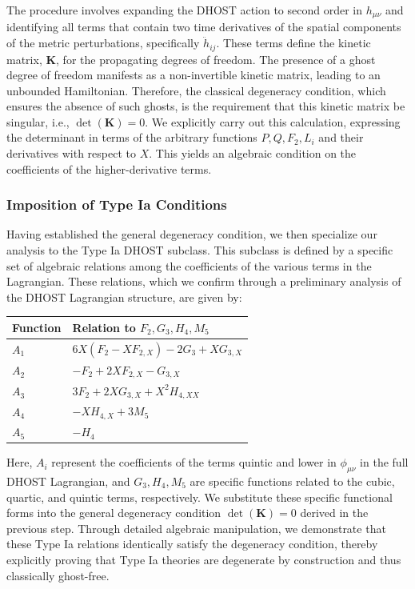 \documentclass[twocolumn]{aastex631}
\begin{document}
The procedure involves expanding the DHOST action to second order in $h_{\mu\nu}$ and identifying all terms that contain two time derivatives of the spatial components of the metric perturbations, specifically $\ddot{h}_{ij}$. These terms define the kinetic matrix, $\mathbf{K}$, for the propagating degrees of freedom. The presence of a ghost degree of freedom manifests as a non-invertible kinetic matrix, leading to an unbounded Hamiltonian. Therefore, the classical degeneracy condition, which ensures the absence of such ghosts, is the requirement that this kinetic matrix be singular, i.e., $\det(\mathbf{K}) = 0$. We explicitly carry out this calculation, expressing the determinant in terms of the arbitrary functions $P, Q, F_2, L_i$ and their derivatives with respect to $X$. This yields an algebraic condition on the coefficients of the higher-derivative terms.

\subsubsection*{Imposition of Type Ia Conditions}
Having established the general degeneracy condition, we then specialize our analysis to the Type Ia DHOST subclass. This subclass is defined by a specific set of algebraic relations among the coefficients of the various terms in the Lagrangian. These relations, which we confirm through a preliminary analysis of the DHOST Lagrangian structure, are given by:
\begin{center}
\begin{tabular}{|l|l|}
\hline
Function & Relation to $F_2, G_3, H_4, M_5$ \\
\hline
$A_1$ & $6X(F_2 - X F_{2,X}) - 2G_3 + X G_{3,X}$ \\
$A_2$ & $-F_2 + 2X F_{2,X} - G_{3,X}$ \\
$A_3$ & $3F_2 + 2X G_{3,X} + X^2 H_{4,XX}$ \\
$A_4$ & $-X H_{4,X} + 3M_5$ \\
$A_5$ & $-H_4$ \\
\hline
\end{tabular}
\end{center}
Here, $A_i$ represent the coefficients of the terms quintic and lower in $\phi_{\mu\nu}$ in the full DHOST Lagrangian, and $G_3, H_4, M_5$ are specific functions related to the cubic, quartic, and quintic terms, respectively. We substitute these specific functional forms into the general degeneracy condition $\det(\mathbf{K}) = 0$ derived in the previous step. Through detailed algebraic manipulation, we demonstrate that these Type Ia relations identically satisfy the degeneracy condition, thereby explicitly proving that Type Ia theories are degenerate by construction and thus classically ghost-free.
\end{document}
